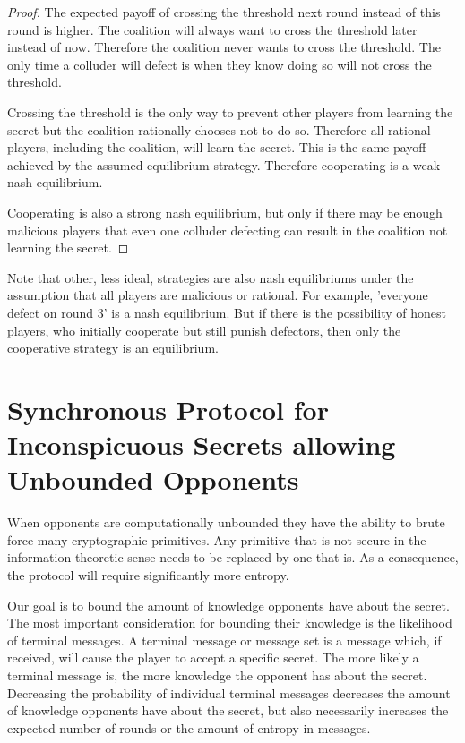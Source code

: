\documentclass{dalcsthesis}
\begin{document}
\begin{proof}
The expected payoff of crossing the threshold next round instead of this round is higher. The coalition will always want to cross the threshold later instead of now. Therefore the coalition never wants to cross the threshold. The only time a colluder will defect is when they know doing so will not cross the threshold.

Crossing the threshold is the only way to prevent other players from learning the secret but the coalition rationally chooses not to do so. Therefore all rational players, including the coalition, will learn the secret. This is the same payoff achieved by the assumed equilibrium strategy. Therefore cooperating is a weak nash equilibrium.

Cooperating is also a strong nash equilibrium, but only if there may be enough malicious players that even one colluder defecting can result in the coalition not learning the secret.
\end{proof}

Note that other, less ideal, strategies are also nash equilibriums under the assumption that all players are malicious or rational. For example, 'everyone defect on round 3' is a nash equilibrium. But if there is the possibility of honest players, who initially cooperate but still punish defectors, then only the cooperative strategy is an equilibrium.

\section{Synchronous Protocol for Inconspicuous Secrets allowing Unbounded Opponents}

When opponents are computationally unbounded they have the ability to brute force many cryptographic primitives. Any primitive that is not secure in the information theoretic sense needs to be replaced by one that is. As a consequence, the protocol will require significantly more entropy.

Our goal is to bound the amount of knowledge opponents have about the secret. The most important consideration for bounding their knowledge is the likelihood of terminal messages. A terminal message or message set is a message which, if received, will cause the player to accept a specific secret. The more likely a terminal message is, the more knowledge the opponent has about the secret. Decreasing the probability of individual terminal messages decreases the amount of knowledge opponents have about the secret, but also necessarily increases the expected number of rounds or the amount of entropy in messages.
\end{document}
